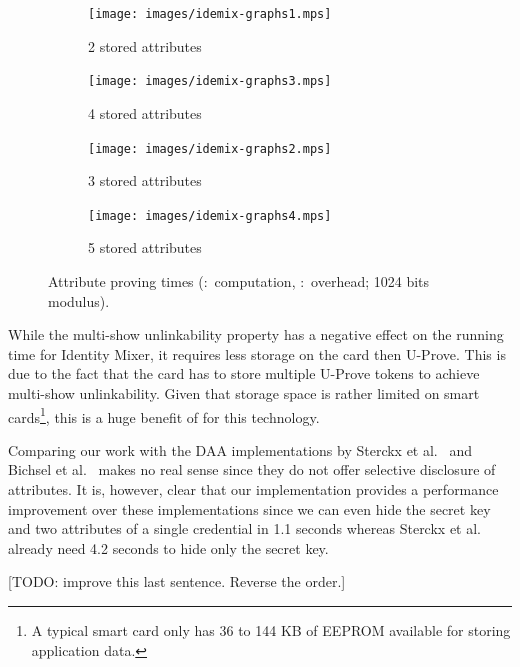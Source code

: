 \begin{figure}[ht]
  \centering
  \begin{subfigure}[b]{0.45\textwidth}
    \texttt{[image: images/idemix-graphs1.mps]}
    \caption{2 stored attributes}
    \label{fig:2attr-sle78}
  \end{subfigure}
  \begin{subfigure}[b]{0.45\textwidth}
    \texttt{[image: images/idemix-graphs3.mps]}
    \caption{4 stored attributes}
    \label{fig:4attr-sle78}
  \end{subfigure}

  \begin{subfigure}[b]{0.45\textwidth}
    \texttt{[image: images/idemix-graphs2.mps]}
    \caption{3 stored attributes}
    \label{fig:3attr-sle78}
  \end{subfigure}
  \begin{subfigure}[b]{0.45\textwidth}
    \texttt{[image: images/idemix-graphs4.mps]}
    \caption{5 stored attributes}
    \label{fig:5attr-sle78}
  \end{subfigure}

  \caption[Attribute proving times.]{
    Attribute proving times
    (:~computation,
      :~overhead; 1024 bits modulus).}
  \label{fig:proving}
\end{figure}

While the multi-show unlinkability property has a negative effect on the running
time for Identity Mixer, it requires less storage on the card then U-Prove. This
is due to the fact that the card has to store multiple U-Prove tokens to achieve
multi-show unlinkability. Given that storage space is rather limited on smart
cards\footnote{A typical smart card only has 36 to 144 KB of EEPROM available
for storing application data.}, this is a huge benefit of for this technology.

Comparing our work with the DAA implementations by Sterckx et
al.~\cite{Sterckx09} and Bichsel et al.~\cite{BichselCGS2009} makes no real
sense since they do not offer selective disclosure of attributes. It is,
however, clear that our implementation provides a performance improvement over
these implementations since we can even hide the secret key and two attributes
of a single credential in 1.1 seconds whereas Sterckx et al. already need 4.2
seconds to hide only the secret key.

[TODO: improve this last sentence. Reverse the order.]